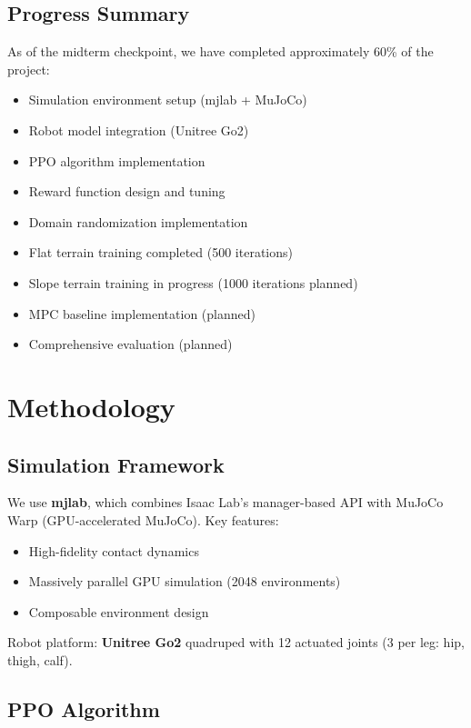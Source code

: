 \documentclass[12pt,a4paper]{article}
\begin{document}
\subsection{Progress Summary}

As of the midterm checkpoint, we have completed approximately 60\% of the project:
\begin{itemize}
    \item [Done] Simulation environment setup (mjlab + MuJoCo)
    \item [Done] Robot model integration (Unitree Go2)
    \item [Done] PPO algorithm implementation
    \item [Done] Reward function design and tuning
    \item [Done] Domain randomization implementation
    \item [Done] Flat terrain training completed (500 iterations)
    \item [In Progress] Slope terrain training in progress (1000 iterations planned)
    \item [Planned] MPC baseline implementation (planned)
    \item [Planned] Comprehensive evaluation (planned)
\end{itemize}

\section{Methodology}

\subsection{Simulation Framework}

We use \textbf{mjlab}, which combines Isaac Lab's manager-based API with MuJoCo Warp (GPU-accelerated MuJoCo). Key features:
\begin{itemize}
    \item High-fidelity contact dynamics
    \item Massively parallel GPU simulation (2048 environments)
    \item Composable environment design
\end{itemize}

Robot platform: \textbf{Unitree Go2} quadruped with 12 actuated joints (3 per leg: hip, thigh, calf).

\subsection{PPO Algorithm}
\end{document}
